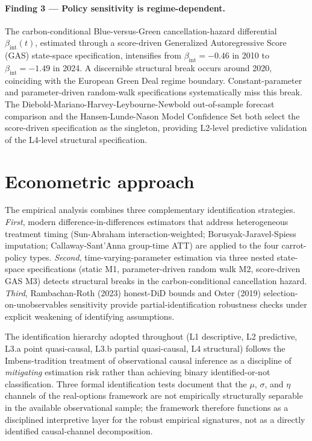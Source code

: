 \documentclass[11pt,a4paper]{article}
\newcommand{\bint}{\beta_{\text{int}}}
\begin{document}
\paragraph{Finding 3 --- Policy sensitivity is regime-dependent.} The carbon-conditional Blue-versus-Green cancellation-hazard differential $\bint(t)$, estimated through a score-driven Generalized Autoregressive Score (GAS) state-space specification, intensifies from $\bint = -0.46$ in 2010 to $\bint = -1.49$ in 2024. A discernible structural break occurs around 2020, coinciding with the European Green Deal regime boundary. Constant-parameter and parameter-driven random-walk specifications systematically miss this break. The Diebold-Mariano-Harvey-Leybourne-Newbold out-of-sample forecast comparison and the Hansen-Lunde-Nason Model Confidence Set both select the score-driven specification as the singleton, providing L2-level predictive validation of the L4-level structural specification.

\section*{Econometric approach}

The empirical analysis combines three complementary identification strategies. \emph{First}, modern difference-in-differences estimators that address heterogeneous treatment timing (Sun-Abraham interaction-weighted; Borusyak-Jaravel-Spiess imputation; Callaway-Sant'Anna group-time ATT) are applied to the four carrot-policy types. \emph{Second}, time-varying-parameter estimation via three nested state-space specifications (static M1, parameter-driven random walk M2, score-driven GAS M3) detects structural breaks in the carbon-conditional cancellation hazard. \emph{Third}, Rambachan-Roth (2023) honest-DiD bounds and Oster (2019) selection-on-unobservables sensitivity provide partial-identification robustness checks under explicit weakening of identifying assumptions.

The identification hierarchy adopted throughout (L1 descriptive, L2 predictive, L3.a point quasi-causal, L3.b partial quasi-causal, L4 structural) follows the Imbens-tradition treatment of observational causal inference \cite{imbens2018causal} as a discipline of \emph{mitigating} estimation risk \cite{blasques2024mitigating} rather than achieving binary identified-or-not classification. Three formal identification tests document that the $\mu$, $\sigma$, and $\eta$ channels of the real-options framework are not empirically structurally separable in the available observational sample; the framework therefore functions as a disciplined interpretive layer for the robust empirical signatures, not as a directly identified causal-channel decomposition.
\end{document}
